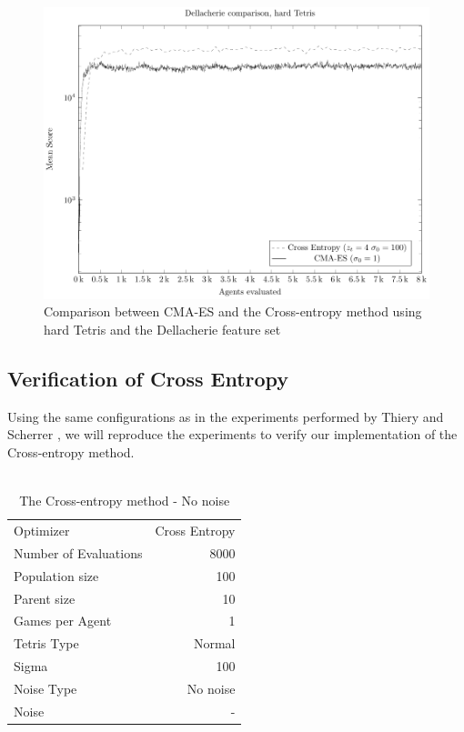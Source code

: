 \begin{figure}[H]
\includegraphics[scale=1]{plots/plotDellCmaVsCEHardTetris}
\caption{Comparison between CMA-ES and the Cross-entropy method
using hard Tetris and the Dellacherie feature set}
\end{figure}

\clearpage

\subsection{Verification of Cross Entropy}
Using the same configurations as in the experiments performed by Thiery and Scherrer \citep{scherrer2009}, we will reproduce the experiments to verify our implementation of the Cross-entropy method.\\
\\
\begin{table}[h!]
\centering
\begin{tabular}{l r}
Optimizer & Cross Entropy\\
Number of Evaluations & 8000\\
Population size & 100\\
Parent size & 10\\
Games per Agent & 1\\
Tetris Type & Normal\\
\hline
Sigma & 100\\
Noise Type & No noise\\
Noise & -
\end{tabular}
\caption{The Cross-entropy method - No noise}
\end{table}

